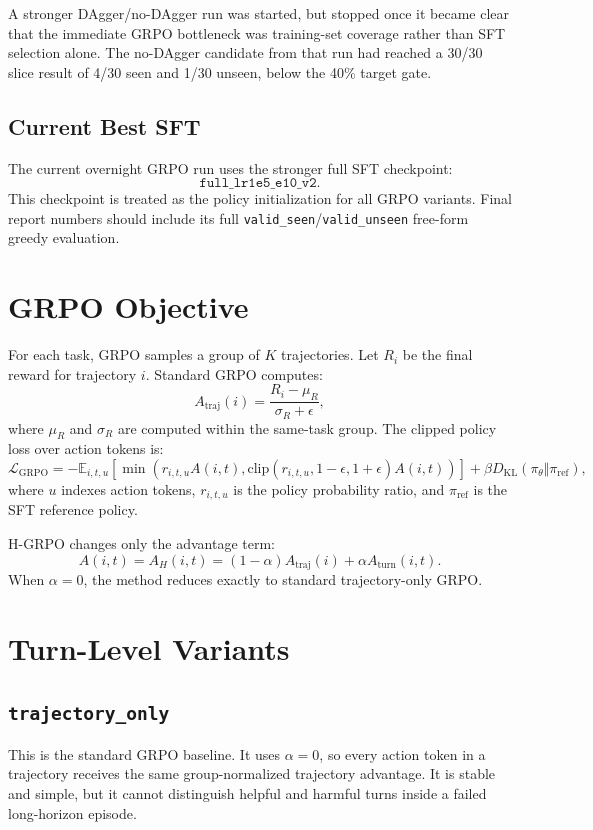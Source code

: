 \documentclass[10pt]{article}
\newcommand{\method}[1]{\texttt{#1}}
\begin{document}
A stronger DAgger/no-DAgger run was started, but stopped once it became clear that the immediate GRPO bottleneck was training-set coverage rather than SFT selection alone. The no-DAgger candidate from that run had reached a 30/30 slice result of 4/30 seen and 1/30 unseen, below the 40\% target gate.

\subsection{Current Best SFT}
The current overnight GRPO run uses the stronger full SFT checkpoint:
\[
\texttt{full\_lr1e5\_e10\_v2}.
\]
This checkpoint is treated as the policy initialization for all GRPO variants. Final report numbers should include its full \texttt{valid\_seen}/\texttt{valid\_unseen} free-form greedy evaluation.

\section{GRPO Objective}
For each task, GRPO samples a group of \(K\) trajectories. Let \(R_i\) be the final reward for trajectory \(i\). Standard GRPO computes:
\[
    A_{\mathrm{traj}}(i) =
    \frac{R_i - \mu_R}{\sigma_R + \epsilon},
\]
where \(\mu_R\) and \(\sigma_R\) are computed within the same-task group. The clipped policy loss over action tokens is:
\[
    \mathcal{L}_{\mathrm{GRPO}} =
    -\mathbb{E}_{i,t,u}\left[
        \min\left(
            r_{i,t,u} A(i,t),
            \mathrm{clip}(r_{i,t,u}, 1-\epsilon, 1+\epsilon) A(i,t)
        \right)
    \right]
    + \beta D_{\mathrm{KL}}(\pi_\theta \Vert \pi_{\mathrm{ref}}),
\]
where \(u\) indexes action tokens, \(r_{i,t,u}\) is the policy probability ratio, and \(\pi_{\mathrm{ref}}\) is the SFT reference policy.

H-GRPO changes only the advantage term:
\[
    A(i,t) = A_H(i,t) =
    (1-\alpha) A_{\mathrm{traj}}(i) + \alpha A_{\mathrm{turn}}(i,t).
\]
When \(\alpha=0\), the method reduces exactly to standard trajectory-only GRPO.

\section{Turn-Level Variants}
\subsection{\method{trajectory\_only}}
This is the standard GRPO baseline. It uses \(\alpha=0\), so every action token in a trajectory receives the same group-normalized trajectory advantage. It is stable and simple, but it cannot distinguish helpful and harmful turns inside a failed long-horizon episode.
\end{document}
